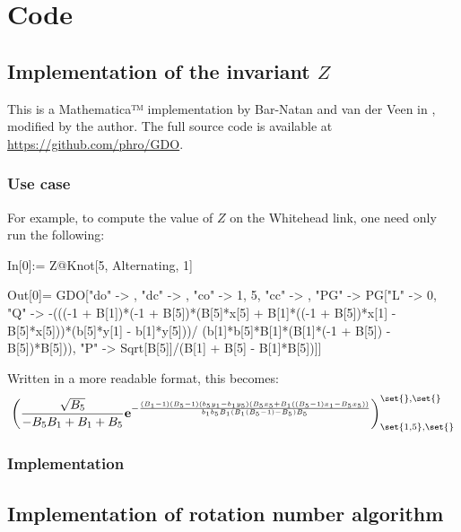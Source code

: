 \chapter{Code}
\section{Implementation of the invariant $Z$}
This is a Mathematica™ implementation by Bar-Natan and van der Veen in
\cite{BV}, modified by the author. The full source code is available at
\url{https://github.com/phro/GDO}.

\subsection{Use case}
For example, to compute the value of $Z$ on the Whitehead link, one need only
run the following:

\begin{mathematica}
In[0]:= Z@Knot[5, Alternating, 1]
\end{mathematica}
\begin{mathematica}
Out[0]= GDO["do" -> {}, "dc" -> {}, "co" -> {1, 5}, "cc" -> {}, "PG" -> PG["L" -> 0, "Q" -> -(((-1 + B[1])*(-1 + B[5])*(B[5]*x[5] + B[1]*((-1 + B[5])*x[1] - B[5]*x[5]))*(b[5]*y[1] - b[1]*y[5]))/ (b[1]*b[5]*B[1]*(B[1]*(-1 + B[5]) - B[5])*B[5])), "P" -> Sqrt[B[5]]/(B[1] + B[5] - B[1]*B[5])]]
\end{mathematica}
Written in a more readable format, this becomes:
\begin{equation}
\left(
        \frac{\sqrt{B_5}}{-B_5 B_1+B_1+B_5}
        \Exp{
                -\frac{
                        \left(B_1-1\right) \left(B_5-1\right)
                        \left(b_5 y_1-b_1 y_5\right)
                        \left(
                                B_5 x_5+
                                B_1 \left((B_5-1) x_1 - B_5 x_5\right)
                        \right)
                }{
                        b_1 b_5 B_1 \left(B_1 \left(B_5-1\right)-B_5\right) B_5
                }
        }
\right)_{\set{1,5},\set{}}^{\set{},\set{}} 
\end{equation}

\subsection{Implementation}



\section{Implementation of rotation number algorithm}

